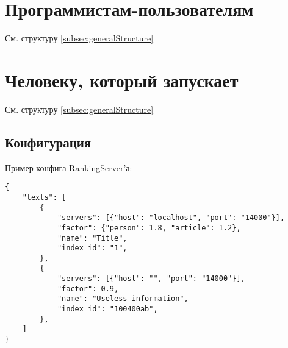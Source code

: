 \documentclass[12pt,a4paper]{article}
\begin{document}
\section{Программистам-пользователям}
См. структуру \ref{subsec:generalStructure}

\section{Человеку, который запускает}
См. структуру \ref{subsec:generalStructure}
\subsection{Конфигурация}
Пример конфига RankingServer'а:
\begin{verbatim}
{
	"texts": [
		{
			"servers": [{"host": "localhost", "port": "14000"}],
			"factor": {"person": 1.8, "article": 1.2},
			"name": "Title",
			"index_id": "1",
		},
		{
			"servers": [{"host": "", "port": "14000"}],
			"factor": 0.9,
			"name": "Useless information",
			"index_id": "100400ab",
		},
	]
}
\end{verbatim}
\end{document}
